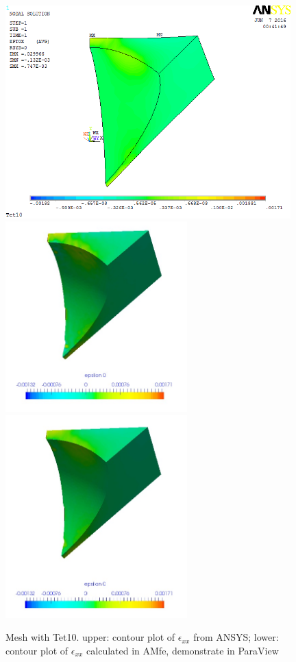 \begin{figure}[htbp]
	\begin{center}
		\includegraphics[width=11cm,clip]{Tet10_Exx.png}
		\includegraphics[width=7cm,clip]{Tet10_Exx_PD.png}  		
		\includegraphics[width=7cm,clip]{Tet10_Exx_P.png} 		
		\caption{Mesh with Tet10. upper: contour plot of $\epsilon_{xx}$ from ANSYS; lower: contour plot of $\epsilon_{xx}$ calculated in AMfe, demonstrate in ParaView} \label{fig: Tet10_Exx}
	\end{center}
\end{figure}
\clearpage 


